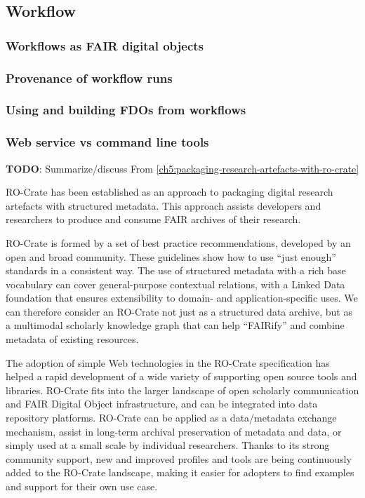\subsection{Workflow}

\subsubsection{Workflows as FAIR digital objects}


\subsubsection{Provenance of workflow runs}


\subsubsection{Using and building FDOs from workflows}


\subsubsection{Web service vs command line tools}


\textbf{TODO}: Summarize/discuss 
From \vref{ch5:packaging-research-artefacts-with-ro-crate}

RO-Crate has been established as an approach to packaging digital
research artefacts with structured metadata. This approach assists
developers and researchers to produce and consume FAIR archives of their
research.

RO-Crate is formed by a set of best practice recommendations, developed
by an open and broad community. These guidelines show how to use ``just
enough'' standards in a consistent way. The use of structured metadata
with a rich base vocabulary can cover general-purpose contextual
relations, with a Linked Data foundation that ensures extensibility to
domain- and application-specific uses. We can therefore consider an
RO-Crate not just as a structured data archive, but as a multimodal
scholarly knowledge graph that can help ``FAIRify'' and combine metadata
of existing resources.

The adoption of simple Web technologies in the RO-Crate specification
has helped a rapid development of a wide variety of supporting open
source tools and libraries. RO-Crate fits into the larger landscape of
open scholarly communication and FAIR Digital Object infrastructure, and
can be integrated into data repository platforms. RO-Crate can be
applied as a data/metadata exchange mechanism, assist in long-term
archival preservation of metadata and data, or simply used at a small
scale by individual researchers. Thanks to its strong community support,
new and improved profiles and tools are being continuously added to the
RO-Crate landscape, making it easier for adopters to find examples and
support for their own use case.

